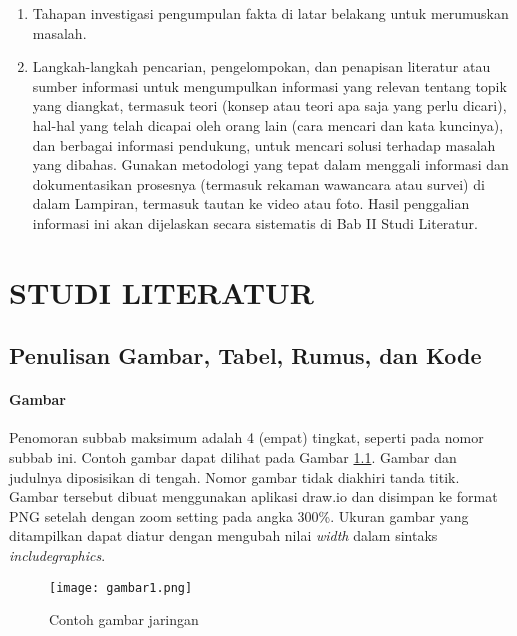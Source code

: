 \documentclass[12pt,a4paper,oneside]{book}
\begin{document}
\begin{enumerate}
\item	Tahapan investigasi pengumpulan fakta di latar belakang untuk merumuskan masalah.
\item	Langkah-langkah pencarian, pengelompokan, dan penapisan literatur atau sumber informasi untuk mengumpulkan informasi yang relevan tentang topik yang diangkat, termasuk teori (konsep atau teori apa saja yang perlu dicari), hal-hal yang telah dicapai oleh orang lain (cara mencari dan kata kuncinya), dan berbagai informasi pendukung, untuk mencari solusi terhadap masalah yang dibahas. Gunakan metodologi yang tepat dalam menggali informasi dan dokumentasikan prosesnya (termasuk rekaman wawancara atau survei) di dalam Lampiran, termasuk tautan ke video atau foto. Hasil penggalian informasi ini akan dijelaskan secara sistematis di Bab II Studi Literatur.
\end{enumerate}

\chapter{STUDI LITERATUR}
\section{Penulisan Gambar, Tabel, Rumus, dan Kode}
\lipsum[1]

\subsubsection{Gambar}
Penomoran subbab maksimum adalah 4 (empat) tingkat, seperti pada nomor subbab ini. Contoh gambar dapat dilihat pada Gambar \ref{gambar:jaringan}. Gambar dan judulnya diposisikan di tengah. Nomor gambar tidak diakhiri tanda titik. Gambar tersebut dibuat menggunakan aplikasi draw.io dan disimpan ke format PNG setelah dengan zoom setting pada angka 300\%. Ukuran gambar yang ditampilkan dapat diatur dengan mengubah nilai \textit{width} dalam sintaks \textit{includegraphics}.

\begin{figure}[t] %
	\centering
  \captionsetup{justification=centering}
    	\texttt{[image: gambar1.png]}
	\caption{Contoh gambar jaringan}
	\label{gambar:jaringan}
\end{figure}
\end{document}
